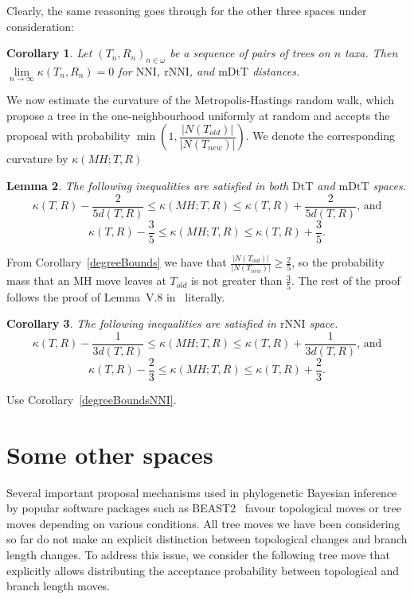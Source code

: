 \documentclass{amsart}
\newtheorem{lemma}{Lemma}
\newtheorem{corollary}[lemma]{Corollary}
\newcommand{\dts}{\mathrm{DtT}}
\newcommand{\nni}{\mathrm{NNI}}
\newcommand{\rnni}{\mathrm{rNNI}}
\newcommand{\mdts}{\mathrm{mDtT}}
\begin{document}
Clearly, the same reasoning goes through for the other three spaces under consideration:

\begin{corollary}
Let $(T_n,R_n)_{n\in\omega}$ be a sequence of pairs of trees on $n$ taxa.
Then $\lim\limits_{n \to \infty}\kappa(T_n,R_n) = 0$ for $\nni$, $\rnni$, and $\mdts$ distances. 
\end{corollary}

We now estimate the curvature of the Metropolis-Hastings random walk, which 
propose a tree in the one-neighbourhood uniformly at random and 
accepts the proposal with probability 
$\min(1, \dfrac{|N(T_{old})|}{|N(T_{new})|})$. We denote the corresponding 
curvature by $\kappa(MH;T,R)$

\begin{lemma}
The following inequalities are satisfied in both $\dts$ and $\mdts$ spaces. 
\[
\kappa(T,R) - \dfrac{2}{5d(T,R)} \leq \kappa(MH;T,R) \leq \kappa(T,R) +
\dfrac{2}{5d(T,R)}\mbox{, and}
\]
\[
\kappa(T,R) - \dfrac35 \leq \kappa(MH;T,R) \leq \kappa(T,R) + \dfrac35.
\]
\end{lemma}

\proof
From Corollary~\ref{degreeBounds} we have that 
$\frac{|N(T_{old})|}{|N(T_{new})|} \geq \frac{2}{5}$, so the probability 
mass that an MH move leaves at $T_{old}$ is not greater than $\frac35$. 
The rest of the
proof follows the proof of Lemma~V.8 in~\cite{Whidden2015-es} literally. 
\endproof

\begin{corollary}
The following inequalities are satisfied in $\rnni$  space.
\[
\kappa(T,R) - \dfrac{1}{3d(T,R)} \leq \kappa(MH;T,R) \leq \kappa(T,R) +
\dfrac{1}{3d(T,R)}\mbox{, and}
\]
\[
\kappa(T,R) - \dfrac23 \leq \kappa(MH;T,R) \leq \kappa(T,R) + \dfrac23.
\]
\end{corollary}

\proof
Use Corollary~\ref{degreeBoundsNNI}.
\endproof

\section{Some other spaces}

Several important proposal mechanisms used in phylogenetic Bayesian inference by 
popular software packages such as BEAST2~\cite{beast2} favour topological moves
or tree moves depending on various conditions. All tree moves we have been 
considering so far do not make an explicit distinction between topological 
changes and branch length changes. To address this issue, we
consider the
following tree move that explicitly allows distributing the acceptance 
probability between topological and branch length moves. 
\end{document}
